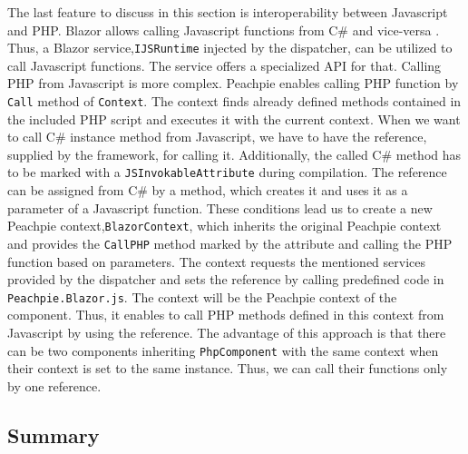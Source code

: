 The last feature to discuss in this section is interoperability between Javascript and PHP.
Blazor allows calling Javascript functions from C\# \cite{online:interop1} and vice-versa \cite{online:interop2}.
Thus, a Blazor service,\texttt{IJSRuntime} injected by the dispatcher, can be utilized to call Javascript functions.
The service offers a specialized API for that.
Calling PHP from Javascript is more complex.
Peachpie enables calling PHP function by \texttt{Call} method of \texttt{Context}. 
The context finds already defined methods contained in the included PHP script and executes it with the current context.
When we want to call C\# instance method from Javascript, we have to have the reference, supplied by the framework, for calling it.
Additionally, the called C\# method has to be marked with a \texttt{JSInvokableAttribute} during compilation.
The reference can be assigned from C\# by a method, which creates it and uses it as a parameter of a Javascript function.
These conditions lead us to create a new Peachpie context,\texttt{BlazorContext}, which inherits the original Peachpie context and provides the \texttt{CallPHP} method marked by the attribute and calling the PHP function based on parameters.
The context requests the mentioned services provided by the dispatcher and sets the reference by calling predefined code in \texttt{Peachpie.Blazor.js}.
The context will be the Peachpie context of the component.
Thus, it enables to call PHP methods defined in this context from Javascript by using the reference.
The advantage of this approach is that there can be two components inheriting \texttt{PhpComponent} with the same context when their context is set to the same instance.
Thus, we can call their functions only by one reference.

\subsection{Summary}

